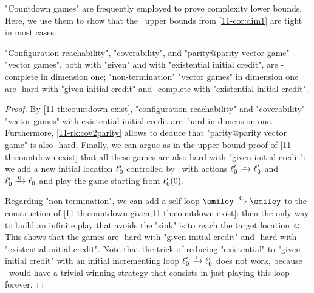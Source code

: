 "Countdown games" are frequently employed to prove complexity lower
bounds.  Here, we use them to show that the \EXPSPACE\ upper bounds
from \cref{11-cor:dim1} are tight in most cases.
\begin{theorem}
\label{11-th:dim1}
  "Configuration reachability", "coverability", and "parity@parity
  vector game" "vector games", both with "given" and with "existential
  initial credit", are \EXPSPACE-complete in dimension one;
  "non-termination" "vector games" in dimension one are \EXP-hard with
  "given initial credit" and \EXPSPACE-complete with "existential
  initial credit".
\end{theorem}
\begin{proof}
  By \cref{11-th:countdown-exist}, "configuration reachability" and
  "coverability" "vector games" with existential initial credit
  are \EXPSPACE-hard in dimension one.
  Furthermore, \cref{11-rk:cov2parity} allows to deduce that
  "parity@parity vector game" is also \EXPSPACE-hard.  Finally, we can
  argue as in the upper bound proof of \cref{11-th:countdown-exist} that
  all these games are also hard with "given initial credit": we add a
  new initial location $\ell'_0$ controlled by \Eve\ with actions
  $\loc'_0\step 1\loc'_0$ and $\loc'_0\step 0\loc_0$ and play the game
  starting from $\ell'_0(0)$.

  Regarding "non-termination", we can add a self loop $\smiley\step
  0\smiley$ to the construction
  of \cref{11-th:countdown-given,11-th:countdown-exist}: then the only way
  to build an infinite play that avoids the "sink" is to reach the
  target location $\smiley$.  This shows that the games are \EXP-hard
  with "given initial credit" and \EXPSPACE-hard with "existential
  initial credit".  Note that the trick of reducing "existential" to
  "given initial credit" with an initial incrementing loop $\loc'_0\step
  1\loc'_0$ does not work, because \Eve\ would have a trivial winning
  strategy that consists in just playing this loop forever.
\end{proof}


